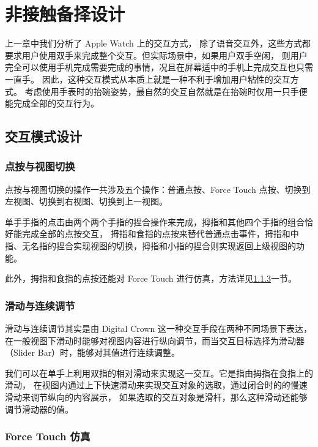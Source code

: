 \chapter{非接触备择设计}

上一章中我们分析了 Apple Watch 上的交互方式，
除了语音交互外，这些方式都要求用户使用双手来完成整个交互。但实际场景中，如果用户双手空闲，
则用户完全可以使用手机完成需要完成的事情，况且在屏幕适中的手机上完成交互也只需一直手。
因此，这种交互模式从本质上就是一种不利于增加用户粘性的交互方式。
考虑使用手表时的抬碗姿势，最自然的交互自然就是在抬碗时仅用一只手便能完成全部的交互行为。

\section{交互模式设计}

\subsection{点按与视图切换}

点按与视图切换的操作一共涉及五个操作：普通点按、Force Touch 点按、切换到左视图、切换到右视图、切换到上一视图。

单手手指的点击由两个两个手指的捏合操作来完成，拇指和其他四个手指的组合恰好能完成全部的点按交互，
拇指和食指的点按来替代普通点击事件，拇指和中指、无名指的捏合实现视图的切换，拇指和小指的捏合则实现返回上级视图的功能。

此外，拇指和食指的点按还能对 Force Touch 进行仿真，方法详见\ref{sub:force-touch-simu}一节。

\subsection{滑动与连续调节}

滑动与连续调节其实是由 Digital Crown 这一种交互手段在两种不同场景下表达，
在一般视图下滑动时能够对视图内容进行纵向调节，而当交互目标选择为滑动器（Slider Bar）时，能够对其值进行连续调整。

我们可以在单手上利用双指的相对滑动来实现这一交互。它是指由拇指在食指上的滑动，
在视图内通过上下快速滑动来实现交互对象的选取，通过闭合时的的慢速滑动来调节纵向的内容展示，
如果选取的交互对象是滑杆，那么这种滑动还能够调节滑动器的值。

\subsection{Force Touch 仿真}
\label{sub:force-touch-simu}

